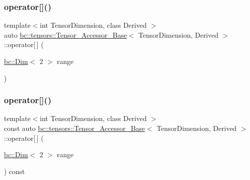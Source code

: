 \subsubsection{\texorpdfstring{operator[]()}{operator[]()}\hspace{0.1cm}{\footnotesize\ttfamily [3/6]}}
{\footnotesize\ttfamily template$<$int Tensor\+Dimension, class Derived $>$ \\
auto \hyperlink{classbc_1_1tensors_1_1Tensor__Accessor__Base}{bc\+::tensors\+::\+Tensor\+\_\+\+Accessor\+\_\+\+Base}$<$ Tensor\+Dimension, Derived $>$\+::operator\mbox{[}$\,$\mbox{]} (\begin{DoxyParamCaption}\item[{\hyperlink{structbc_1_1Dim}{bc\+::\+Dim}$<$ 2 $>$}]{range }\end{DoxyParamCaption})\hspace{0.3cm}{\ttfamily [inline]}}

\mbox{\label{classbc_1_1tensors_1_1Tensor__Accessor__Base_a957d074b5d1d1ac70d0fb6bd70184179}} 
\subsubsection{\texorpdfstring{operator[]()}{operator[]()}\hspace{0.1cm}{\footnotesize\ttfamily [4/6]}}
{\footnotesize\ttfamily template$<$int Tensor\+Dimension, class Derived $>$ \\
const auto \hyperlink{classbc_1_1tensors_1_1Tensor__Accessor__Base}{bc\+::tensors\+::\+Tensor\+\_\+\+Accessor\+\_\+\+Base}$<$ Tensor\+Dimension, Derived $>$\+::operator\mbox{[}$\,$\mbox{]} (\begin{DoxyParamCaption}\item[{\hyperlink{structbc_1_1Dim}{bc\+::\+Dim}$<$ 2 $>$}]{range }\end{DoxyParamCaption}) const\hspace{0.3cm}{\ttfamily [inline]}}

\mbox{\label{classbc_1_1tensors_1_1Tensor__Accessor__Base_a19adf43803db2cbdd638ce7cddf023de}} 
